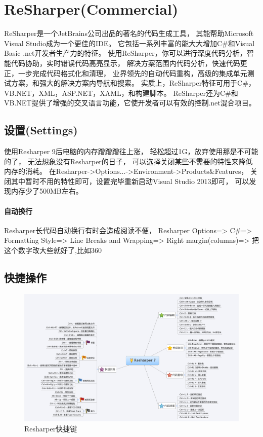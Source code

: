 \documentclass{book}
\begin{document}
\section{ReSharper(Commercial)}

ReSharper是一个JetBrains公司出品的著名的代码生成工具，
其能帮助Microsoft Visual Studio成为一个更佳的IDE。
它包括一系列丰富的能大大增加C\#和Visual Basic .net开发者生产力的特征。
使用ReSharper，你可以进行深度代码分析，智能代码协助，实时错误代码高亮显示，
解决方案范围内代码分析，快速代码更正，一步完成代码格式化和清理，
业界领先的自动代码重构，高级的集成单元测试方案，和强大的解决方案内导航和搜索。
实质上，ReSharper特征可用于C\#，VB.NET，XML，ASP.NET，XAML，和构建脚本。
ReSharper还为C\#和VB.NET提供了增强的交叉语言功能，它使开发者可以有效的控制.net混合项目。

\subsection{设置(Settings)}

使用Resharper 9后电脑的内存蹭蹭蹭往上涨，
轻松超过1G，放弃使用那是不可能的了，
无法想象没有Resharper的日子，
可以选择关闭某些不需要的特性来降低内存的消耗。
在Resharper->Options...->Environment->Products\&Features，
关闭其中暂时不用的特性即可，设置完毕重新启动Visual Studio 2013即可，
可以发现内存少了500MB左右。

\paragraph{自动换行}Resharper长代码自动换行有时会造成阅读不便，
Resharper Options=>
C\#=>
Formatting Style=>
Line Breaks and Wrapping=>
Right margin(columns)=> 把这个数字改大些就好了,比如360

\subsection{快捷操作}

\begin{figure}[htbp]
	\centering
	\includegraphics[scale=0.3]{ReSharperShortcut.png}
	\caption{Resharper快捷键}
	\label{fig:ReSharperShortcut}
\end{figure}
\end{document}
